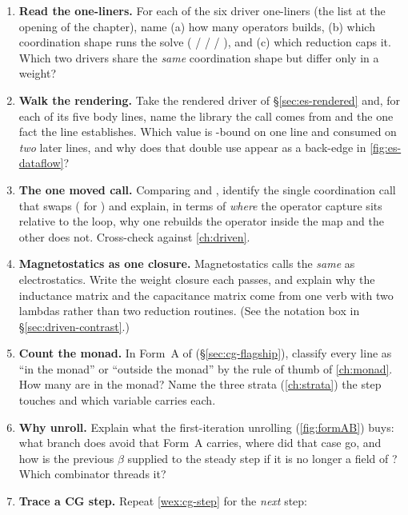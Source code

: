\exercisessection
\begin{enumerate}[nosep]
  \item \textbf{Read the one-liners.} For each of the six driver one-liners (the list
  at the opening of the chapter), name (a) how many operators 
  builds, (b) which coordination shape runs the solve ( /
   /  / ), and (c) which
  reduction caps it. Which two drivers share the \emph{same} coordination shape but
  differ only in a weight?
  \item \textbf{Walk the rendering.} Take the rendered  driver of
  \S\ref{sec:es-rendered} and, for each of its five body lines, name the library the
  call comes from and the one fact the line establishes. Which value is -bound
  on one line and consumed on \emph{two} later lines, and why does that double use
  appear as a back-edge in \cref{fig:es-dataflow}?
  \item \textbf{The one moved call.} Comparing  and ,
  identify the single coordination call that swaps ( for
  ) and explain, in terms of \emph{where} the operator capture
  sits relative to the loop, why one rebuilds the operator inside the map and the other
  does not. Cross-check against \cref{ch:driven}.
  \item \textbf{Magnetostatics as one closure.} Magnetostatics calls the \emph{same}
   as electrostatics. Write the weight closure each passes, and
  explain why the inductance matrix and the capacitance matrix come from one verb with
  two lambdas rather than two reduction routines. (See the notation box in
  \S\ref{sec:driven-contrast}.)
  \item \textbf{Count the monad.} In Form~A of 
  (\S\ref{sec:cg-flagship}), classify every line as ``in the monad'' or ``outside the
  monad'' by the rule of thumb of \cref{ch:monad}. How many are in the monad? Name the
  three strata (\cref{ch:strata}) the step touches and which variable carries each.
  \item \textbf{Why unroll.} Explain what the first-iteration unrolling
  (\cref{fig:formAB}) buys: what branch does  avoid that Form~A
  carries, where did that case go, and how is the previous $\beta$ supplied to the
  steady step if it is no longer a field of ? Which combinator threads it?
  \item \textbf{Trace a CG step.} Repeat \cref{wex:cg-step} for the \emph{next} step:

\end{enumerate}
